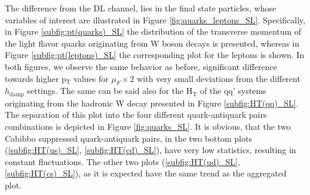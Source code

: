 \indent The difference from the DL channel, lies in the final state particles, whose variables of interest are illustrated in Figure \ref{fig:quarks_leptons_SL}. Specifically, in Figure \ref{subfig:pt(quarks)_SL} the distribution of the transverse momentum of the light flavor quarks originating from W boson decays is presented, whereas in Figure \ref{subfig:pt(leptons)_SL} the corresponding plot for the leptons is shown. In both figures, we observe the same behavior as before, significant difference towards higher p$_{\text{T}}$ values for $\mu_F \times 2$ with very small deviations from the different $h_{\text{damp}}$ settings. The same can be said also for the H$_{\text{T}}$ of the $\overline{\text{q}}$q' systems originating from the hadronic W decay presented in Figure \ref{subfig:HT(qq)_SL}. The separation of this plot into the four different quark-antiquark pairs combinations is depicted in Figure \ref{fig:quarks_SL}. It is obvious, that the two Cabibbo suppressed quark-antiquark pairs, in the two bottom plots (\ref{subfig:HT(us)_SL}, \ref{subfig:HT(cd)_SL}), have very low statistics, resulting in constant fluctuations. The other two plots (\ref{subfig:HT(ud)_SL}, \ref{subfig:HT(cs)_SL}), as it is expected have the same trend as the aggregated plot.\\

